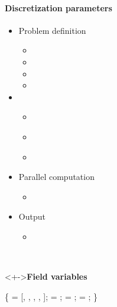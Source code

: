 
\begin{frame}[fragile] 
\secframetitle{\ssParameters}
\framesubtitle{Discretization parameters}
\vspace{-0.2in}
\begin{minipage}[t]{1.7in}
\begin{itemize}
\item Problem definition
  \begin{itemize}
  \item {}
  \item {}
  \item {}
  \item {}
  \end{itemize}
\item {}
  \begin{itemize}
  \item \textcolor{green!50!black}{}
  \item \textcolor{green!50!black}{}
  \item {}
  \end{itemize}
\item Parallel computation
  \begin{itemize}
  \item {}
  \end{itemize}
\item Output
  \begin{itemize}
    \item {}
  \end{itemize}
\end{itemize}
\end{minipage} \
\begin{minipage}[t]{2.6in}
\vspace{-0.2in}
  \begin{block}<+->{\textbf{Field variables}}
  \footnotesize \vspace{-0.1in}
\begin{semiverbatim}
 \{
    = [,
           ,
           ,
           ,
           ];
      = ;
       = ;
    = ;    
\}
\end{semiverbatim}
\end{block}
\end{minipage}
\end{frame}
  

